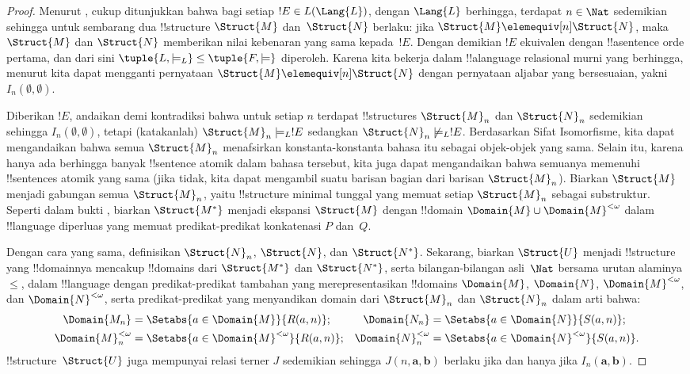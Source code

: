 \documentclass[../../../include/open-logic-section]{subfiles}
\begin{document}
\begin{proof}
Menurut , cukup ditunjukkan bahwa bagi setiap $!E
\in L(\Lang{L})$, dengan $\Lang{L}$ berhingga, terdapat $n \in \Nat$
sedemikian sehingga untuk sembarang dua !!{structure} $\Struct{M}$
dan~$\Struct{N}$ berlaku: jika $\Struct{M} \elemequiv[n] \Struct{N}$, maka
$\Struct{M}$ dan $\Struct{N}$ memberikan nilai kebenaran yang sama
kepada~$!E$. Dengan demikian $!E$ ekuivalen dengan !!a{sentence} orde pertama,
dan dari sini $\tuple{L, \models_L} \leq \tuple{F, \models}$ diperoleh.
Karena kita bekerja dalam !!a{language} relasional murni yang berhingga,
menurut  kita dapat mengganti pernyataan
$\Struct{M} \elemequiv[n] \Struct{N}$ dengan pernyataan aljabar yang
bersesuaian, yakni $I_n(\emptyset,\emptyset)$.

Diberikan $!E$, andaikan demi kontradiksi bahwa untuk setiap $n$ terdapat
!!{structure}s $\Struct{M}_n$ dan $\Struct{N}_n$ sedemikian sehingga
$I_n(\emptyset, \emptyset)$, tetapi (katakanlah) $\Struct{M}_n \models_L !E$
sedangkan $\Struct{N}_n \not\models_L !E$. Berdasarkan Sifat Isomorfisme, kita
dapat mengandaikan bahwa semua $\Struct{M}_n$ menafsirkan konstanta-konstanta bahasa
itu sebagai objek-objek yang sama. Selain itu, karena hanya ada berhingga
banyak !!{sentence} atomik dalam bahasa tersebut, kita juga dapat
mengandaikan bahwa semuanya memenuhi !!{sentence}s atomik yang sama
(jika tidak, kita dapat mengambil suatu barisan bagian dari barisan
$\Struct{M}_n$). Biarkan $\Struct{M}$ menjadi gabungan semua
$\Struct{M}_n$, yaitu !!{structure} minimal tunggal yang memuat setiap
$\Struct{M}_n$ sebagai substruktur. Seperti dalam bukti
, biarkan $\Struct{M^*}$ menjadi ekspansi
$\Struct{M}$ dengan !!{domain} $\Domain{M} \cup \Domain{M}^{<\omega}$ dalam
!!{language} diperluas yang memuat predikat-predikat konkatenasi $P$ dan~$Q$.

Dengan cara yang sama, definisikan $\Struct{N}_n$, $\Struct{N}$, dan
$\Struct{N^*}$. Sekarang, biarkan $\Struct{U}$ menjadi !!{structure} yang
!!{domain}nya mencakup !!{domain}s dari $\Struct{M^*}$ dan $\Struct{N^*}$,
serta bilangan-bilangan asli~$\Nat$ bersama urutan alaminya~$\le$, dalam
!!{language} dengan predikat-predikat tambahan yang merepresentasikan
!!{domain}s $\Domain{M}$, $\Domain{N}$, $\Domain{M}^{<\omega}$, dan
$\Domain{N}^{<\omega}$, serta predikat-predikat yang menyandikan domain dari
$\Struct{M}_n$ dan $\Struct{N}_n$ dalam arti bahwa:
\begin{align*}
  \Domain{M_n} & = \Setabs{a \in \Domain{M}}{R(a, n)}; &
  \Domain{N_n} & = \Setabs{a \in \Domain{N}}{S(a,n)}; \\
  \Domain{M}^{<\omega}_n & = \Setabs{a \in \Domain{M}^{<\omega}}{R(a,n)}; &
  \Domain{N}^{<\omega}_n & = \Setabs{a \in \Domain{N}^{<\omega}}{S(a,n)}.
\end{align*}
!!{structure}~$\Struct{U}$ juga mempunyai relasi terner $J$ sedemikian
sehingga $J(n, \mathbf{a}, \mathbf{b})$ berlaku jika dan hanya jika
$I_n(\mathbf{a}, \mathbf{b})$.


\end{proof}
\end{document}
